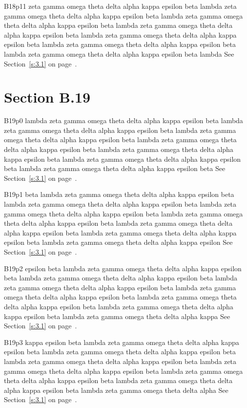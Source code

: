 B18p11 zeta gamma omega theta delta alpha kappa epsilon beta lambda zeta gamma omega theta delta alpha kappa epsilon beta lambda zeta gamma omega theta delta alpha kappa epsilon beta lambda zeta gamma omega theta delta alpha kappa epsilon beta lambda zeta gamma omega theta delta alpha kappa epsilon beta lambda zeta gamma omega theta delta alpha kappa epsilon beta lambda zeta gamma omega theta delta alpha kappa epsilon beta lambda See Section~\ref{s:3.1} on page~\pageref{s:3.1}.

\section{Section B.19}\label{s:B.19}
B19p0 lambda zeta gamma omega theta delta alpha kappa epsilon beta lambda zeta gamma omega theta delta alpha kappa epsilon beta lambda zeta gamma omega theta delta alpha kappa epsilon beta lambda zeta gamma omega theta delta alpha kappa epsilon beta lambda zeta gamma omega theta delta alpha kappa epsilon beta lambda zeta gamma omega theta delta alpha kappa epsilon beta lambda zeta gamma omega theta delta alpha kappa epsilon beta See Section~\ref{s:3.1} on page~\pageref{s:3.1}.

B19p1 beta lambda zeta gamma omega theta delta alpha kappa epsilon beta lambda zeta gamma omega theta delta alpha kappa epsilon beta lambda zeta gamma omega theta delta alpha kappa epsilon beta lambda zeta gamma omega theta delta alpha kappa epsilon beta lambda zeta gamma omega theta delta alpha kappa epsilon beta lambda zeta gamma omega theta delta alpha kappa epsilon beta lambda zeta gamma omega theta delta alpha kappa epsilon See Section~\ref{s:3.1} on page~\pageref{s:3.1}.

B19p2 epsilon beta lambda zeta gamma omega theta delta alpha kappa epsilon beta lambda zeta gamma omega theta delta alpha kappa epsilon beta lambda zeta gamma omega theta delta alpha kappa epsilon beta lambda zeta gamma omega theta delta alpha kappa epsilon beta lambda zeta gamma omega theta delta alpha kappa epsilon beta lambda zeta gamma omega theta delta alpha kappa epsilon beta lambda zeta gamma omega theta delta alpha kappa See Section~\ref{s:3.1} on page~\pageref{s:3.1}.

B19p3 kappa epsilon beta lambda zeta gamma omega theta delta alpha kappa epsilon beta lambda zeta gamma omega theta delta alpha kappa epsilon beta lambda zeta gamma omega theta delta alpha kappa epsilon beta lambda zeta gamma omega theta delta alpha kappa epsilon beta lambda zeta gamma omega theta delta alpha kappa epsilon beta lambda zeta gamma omega theta delta alpha kappa epsilon beta lambda zeta gamma omega theta delta alpha See Section~\ref{s:3.1} on page~\pageref{s:3.1}.

